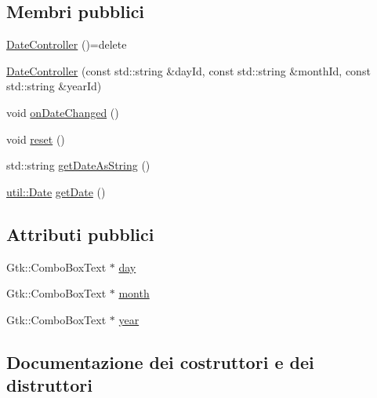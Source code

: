 \subsection*{Membri pubblici}
\begin{DoxyCompactItemize}
\item 
\hyperlink{structmm_1_1_date_controller_a3244d913ab9d7b96e9617f8711e34bd8}{Date\+Controller} ()=delete
\item 
\hyperlink{structmm_1_1_date_controller_a591167277348214a72634a4bbc9272ad}{Date\+Controller} (const std\+::string \&day\+Id, const std\+::string \&month\+Id, const std\+::string \&year\+Id)
\item 
void \hyperlink{structmm_1_1_date_controller_a7474c420c78178ee6ee6a2e66c16803f}{on\+Date\+Changed} ()
\item 
void \hyperlink{structmm_1_1_date_controller_a9e09c31aa55c3389c6919c716bb8b0dc}{reset} ()
\item 
std\+::string \hyperlink{structmm_1_1_date_controller_a8ebf6bda6699414521e4e299fd59e843}{get\+Date\+As\+String} ()
\item 
\hyperlink{structmm_1_1util_1_1_date}{util\+::\+Date} \hyperlink{structmm_1_1_date_controller_aa3c0122bfcc36e8d8b43c8ca7ca76197}{get\+Date} ()
\end{DoxyCompactItemize}
\subsection*{Attributi pubblici}
\begin{DoxyCompactItemize}
\item 
Gtk\+::\+Combo\+Box\+Text $\ast$ \hyperlink{structmm_1_1_date_controller_a332df89b4a88fe3ace3d6d86934a575d}{day}
\item 
Gtk\+::\+Combo\+Box\+Text $\ast$ \hyperlink{structmm_1_1_date_controller_a1e7373cef0b00e63343ef9d30a1e80c5}{month}
\item 
Gtk\+::\+Combo\+Box\+Text $\ast$ \hyperlink{structmm_1_1_date_controller_a36179406cda47b8c18d1a84945a5e61c}{year}
\end{DoxyCompactItemize}


\subsection{Documentazione dei costruttori e dei distruttori}
\mbox{\label{structmm_1_1_date_controller_a3244d913ab9d7b96e9617f8711e34bd8}} 
